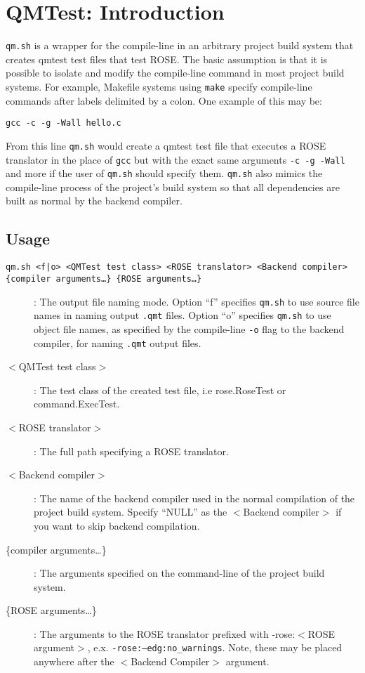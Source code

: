 {\scriptsize  }

\section{QMTest: Introduction}
{\tt qm.sh} is a wrapper for the compile-line in an arbitrary project build 
system that creates qmtest test files that test ROSE. The basic assumption
is that it is possible to isolate and modify the compile-line command in most
project build systems. For example, Makefile systems using {\tt make} specify
compile-line commands after labels delimited by a colon. One example of this
may be:

\begin{center}
  {\tt gcc -c -g -Wall hello.c}
\end{center}
From this line {\tt qm.sh} would create a qmtest test file that executes
a ROSE translator in the place of {\tt gcc} but with the exact same arguments
{\tt -c -g -Wall} and more if the user of {\tt qm.sh} should specify them.
{\tt qm.sh} also mimics the compile-line process of the project's build system
so that all dependencies are built as normal by the backend compiler.

\subsection{Usage}

{\tt qm.sh <f|o> <QMTest test class> <ROSE translator> <Backend compiler> 
\{compiler arguments\ldots\} \{ROSE arguments\ldots\}}

\begin{description}
  \item[{\large {\tt <f|o>}}] : The output file naming mode. Option ``f'' specifies
	{\tt qm.sh} to use source file names in naming output {\tt .qmt} files.
	Option ``o'' specifies {\tt qm.sh} to use object file names, as
	specified by the compile-line {\tt -o} flag to the backend compiler,
	for naming {\tt .qmt} output files.
  \item[$<$QMTest test class$>$] : The test class of the created test file,
	i.e rose.RoseTest or command.ExecTest.
  \item[$<$ROSE translator$>$] : The full path specifying a ROSE translator.
  \item[$<$Backend compiler$>$] : The name of the backend compiler used in
	the normal compilation of the project build system. Specify ``NULL'' as
	the $<$Backend compiler$>$ if you want to skip backend compilation.
  \item[\{compiler arguments\ldots\}] : The arguments specified on
	the command-line of the project build system.
  \item[\{ROSE arguments\ldots\}] : The arguments to the ROSE translator
	prefixed with -rose:$<$ROSE argument$>$, e.x. 
	{\tt -rose:--edg:no\_warnings}. Note, these may be placed anywhere
	after the $<$Backend Compiler$>$ argument.
\end{description}

